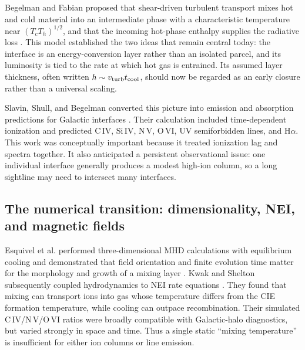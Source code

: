 \documentclass[english,a4paper]{my_memo2}
\newcommand{\tcool}{t_{\rm cool}}
\begin{document}
Begelman and Fabian proposed that shear-driven turbulent transport mixes hot
and cold material into an intermediate phase with a characteristic temperature
near $(T_cT_h)^{1/2}$, and that the incoming hot-phase enthalpy supplies the
radiative loss \cite{Begelman1990}.  This model established the two ideas that
remain central today: the interface is an energy-conversion layer rather than
an isolated parcel, and its luminosity is tied to the rate at which hot gas is
entrained.  Its assumed layer thickness, often written
$h\sim v_{\rm turb}\tcool$, should now be regarded as an early closure rather
than a universal scaling.

Slavin, Shull, and Begelman converted this picture into emission and absorption
predictions for Galactic interfaces \cite{Slavin1993}.  Their calculation
included time-dependent ionization and predicted C\,IV, Si\,IV, N\,V, O\,VI,
UV semiforbidden lines, and H$\alpha$.  This work was conceptually important
because it treated ionization lag and spectra together.  It also anticipated a
persistent observational issue: one individual interface generally produces a
modest high-ion column, so a long sightline may need to intersect many
interfaces.

\subsection{The numerical transition: dimensionality, NEI, and magnetic fields}

Esquivel et al. performed three-dimensional MHD calculations with equilibrium
cooling and demonstrated that field orientation and finite evolution time
matter for the morphology and growth of a mixing layer \cite{Esquivel2006}.
Kwak and Shelton subsequently coupled hydrodynamics to NEI rate equations
\cite{Kwak2010}.  They found that mixing can transport ions into gas whose
temperature differs from the CIE formation temperature, while cooling can
outpace recombination.  Their simulated C\,IV/N\,V/O\,VI ratios were broadly
compatible with Galactic-halo diagnostics, but varied strongly in space and
time.  Thus a single static ``mixing temperature'' is insufficient for either
ion columns or line emission.
\end{document}
